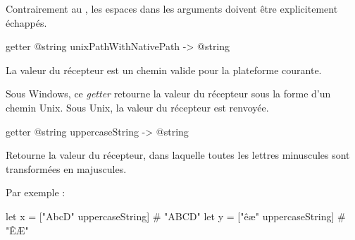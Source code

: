 Contrairement au , les espaces dans les arguments doivent être explicitement échappés.





\begin{galgas4box}
getter @string unixPathWithNativePath -> @string
\end{galgas4box}

La valeur du récepteur est un chemin valide pour la plateforme courante.

Sous Windows, ce \emph{getter} retourne la valeur du récepteur sous la forme d'un chemin Unix. Sous Unix, la valeur du récepteur est renvoyée.














\begin{galgas4box}
getter @string uppercaseString -> @string
\end{galgas4box}

Retourne la valeur du récepteur, dans laquelle toutes les lettres minuscules sont transformées en majuscules.

Par exemple :
\begin{galgas4}
let x = ["AbcD" uppercaseString] # "ABCD"
let y = ["êæ" uppercaseString] # "ÊÆ"
\end{galgas4}














%
















